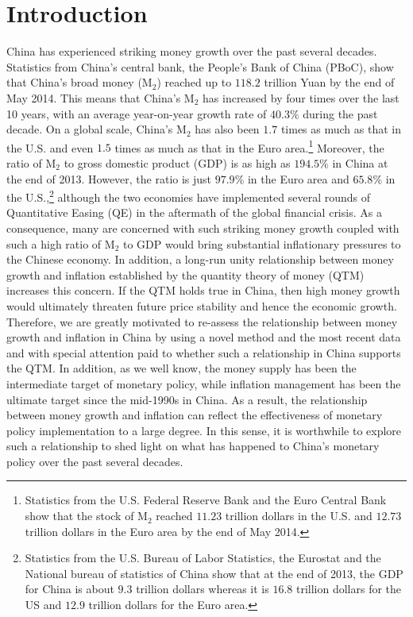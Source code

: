 \documentclass[a4paper,fleqn]{cas-sc}
\begin{document}
\section{Introduction}
China has experienced striking money growth over the past several decades. Statistics from China's central bank, the People's Bank of China (PBoC), show that China's broad money (M$_2$) reached up to $118.2$ trillion Yuan by the end of May 2014. This means that China's M$_2$ has increased by four times over the last 10 years, with an average year-on-year growth rate of $40.3\%$ during the past decade. On a global scale, China's M$_2$ has also been $1.7$ times as much as that in the U.S. and even $1.5$ times as much as that in the Euro area.\footnote{Statistics from the U.S. Federal Reserve Bank and the Euro Central Bank show that the stock of M$_2$ reached $11.23$ trillion dollars in the U.S. and $12.73$ trillion dollars in the Euro area by the end of May 2014.} Moreover, the ratio of M$_2$ to gross domestic product (GDP) is as high as $194.5\%$ in China at the end of 2013. However, the ratio is just $97.9\%$ in the Euro area and $65.8\%$ in the U.S.,\footnote{Statistics from the U.S. Bureau of Labor Statistics, the Eurostat and the National bureau of statistics of China show that at the end of 2013, the GDP for China is about $9.3$ trillion dollars whereas it is $16.8$ trillion dollars for the US and $12.9$ trillion dollars for the Euro area.} although the two economies have implemented several rounds of Quantitative Easing (QE) in the aftermath of the global financial crisis. As a consequence, many are concerned with such striking money growth coupled with such a high ratio of M$_2$ to GDP would bring substantial inflationary pressures to the Chinese economy. In addition, a long-run unity relationship between money growth and inflation established by the quantity theory of money (QTM) increases this concern. If the QTM holds true in China, then high money growth would ultimately threaten future price stability and hence the economic growth. Therefore, we are greatly motivated to re-assess the relationship between money growth and inflation in China by using a novel method and the most recent data and with special attention paid to whether such a relationship in China supports the QTM. In addition, as we well know, the money supply has been the intermediate target of monetary policy, while inflation management has been the ultimate target since the mid-1990s in China. As a result, the relationship between money growth and inflation can reflect the effectiveness of monetary policy implementation to a large degree. In this sense, it is worthwhile to explore such a relationship to shed light on what has happened to China's monetary policy over the past several decades.
\end{document}
